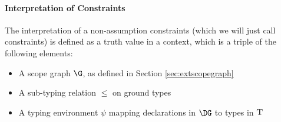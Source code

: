 


\paragraph{Interpretation of Constraints}

\newcommand{\labl}[1]{\tab \text{\sc (#1)}\medskip}
\newcommand{\extenv}{\G,\leq}

The interpretation of a non-assumption constraints (which we will just call
constraints) is defined as a truth value in a context, which is a triple of the
following elements:
\begin{itemize}
 \item A scope graph $\G$, as defined in Section \ref{sec:extscopegraph}
 \item A sub-typing relation $\leq$ on ground types
 \item A typing environment $\psi$ mapping declarations in $\DG$ to types in 
 $\text{\sc T}$
\end{itemize}

